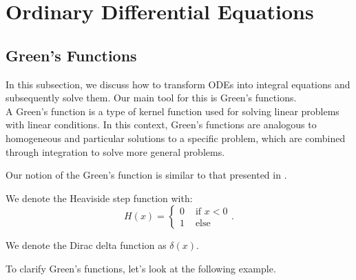 \documentclass[a4paper,12pt]{article}
\begin{document}
\section{Ordinary Differential Equations}

\subsection{Green's Functions}
In this subsection, we discuss how to transform ODEs into integral equations and
subsequently solve them. Our main tool for this is Green's functions. \\

A Green's function is a type of kernel function used
for solving linear problems with linear conditions. In this context,
Green's functions are analogous to homogeneous and particular solutions
to a specific problem, which are combined through integration to solve
more general problems.

\begin{related}
  Our notion of the Green's function is similar to that presented
  in \cite{hwang_simulationtabulation_2001}.
\end{related}


\begin{notation}[$H$]
  We denote the Heaviside step function with:
  \begin{equation}
    H(x) = \begin{cases}
      0 & \text{ if } x<0 \\
      1 & \text{ else }
    \end{cases}.
  \end{equation}
\end{notation}

\begin{notation}[$\delta$]
  We denote the Dirac delta function as $\delta(x)$.
\end{notation}


To clarify Green's functions, let's look at the following example.
\end{document}
